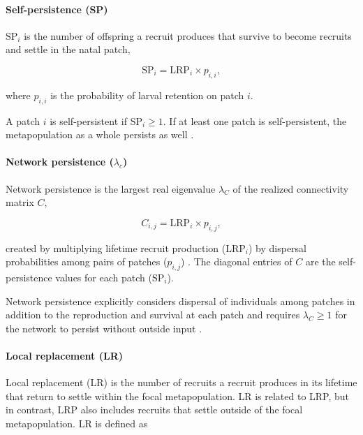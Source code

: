 \documentclass[12pt, oneside]{article}   	%
\begin{document}
\paragraph*{Self-persistence (SP)} 

$\text{SP}_i$ is the number of offspring a recruit produces that survive to become recruits and settle in the natal patch,

\begin{equation}
\text{SP}_i = \text{LRP}_i \times p_{i,i}, \label{EQN_SP} 
\end{equation}

where $p_{i,i}$ is the probability of larval retention on patch $i$.

A patch $i$ is self-persistent if $\text{SP}_i \geq 1$. If at least one patch is self-persistent, the metapopulation as a whole persists as well \citep{hastings_persistence_2006, burgess2014beyond}. 

\paragraph*{Network persistence ($\lambda_c$)}

Network persistence is the largest real eigenvalue $\lambda_C$ of the realized connectivity matrix $C$,

\begin{equation}
C_{i,j} = \text{LRP}_i \times p_{i,j}, \label{EQN_Connectivity_matrix}
\end{equation} 

created by multiplying lifetime recruit production ($\text{LRP}_i$) by dispersal probabilities among pairs of patches ($p_{i,j}$) \citep{burgess2014beyond}. The diagonal entries of $C$ are the self-persistence values for each patch ($\text{SP}_i$).

Network persistence explicitly considers dispersal of individuals among patches in addition to the reproduction and survival at each patch and requires $\lambda_C \geq 1$ for the network to persist without outside input \citep{hastings_persistence_2006, white_population_2010, burgess2014beyond}.

\paragraph*{Local replacement (LR)}

Local replacement (LR) is the number of recruits a recruit produces in its lifetime that return to settle within the focal metapopulation. LR is related to LRP, but in contrast, LRP also includes recruits that settle outside of the focal metapopulation. LR is defined as 
\end{document}
